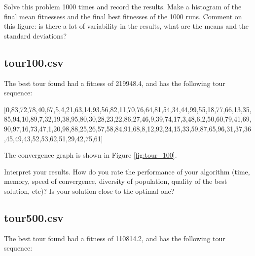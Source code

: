 \documentclass[a4paper,10pt]{article}
\newcommand{\ReplaceMe}[1]{{\color{blue}#1}}
\begin{document}
Solve this problem 1000 times and record the results. Make a histogram of the final mean fitnessess and the final best fitnesses of the 1000 runs. Comment on this figure: is there a lot of variability in the results, what are the means and the standard deviations?

\subsection{tour100.csv}


The best tour found had a fitness of 219948.4, and has the following tour sequence: 

[0,83,72,78,40,67,5,4,21,63,14,93,56,82,11,70,76,64,81,54,34,44,99,55,18,77,66,13,35,85,94,10,89,7,32,19,38,95,80,30,28,23,22,86,27,46,9,39,74,17,3,48,6,2,50,60,79,41,69,90,97,16,73,47,1,20,98,88,25,26,57,58,84,91,68,8,12,92,24,15,33,59,87,65,96,31,37,36,45,49,43,52,53,62,51,29,42,75,61]

The convergence graph is shown in Figure \ref{fig:tour_100}.

Interpret your results. How do you rate the performance of your algorithm (time, memory, speed of convergence, diversity of population, quality of the best solution, etc)? Is your solution close to the optimal one?

\subsection{tour500.csv}


The best tour found had a fitness of 110814.2, and has the following tour sequence:
\end{document}
